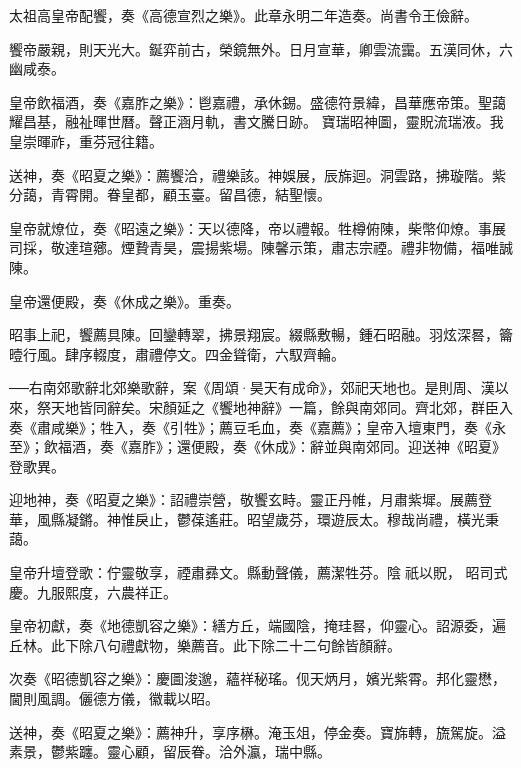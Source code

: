 \begin{pinyinscope}
 太祖高皇帝配饗，奏《高德宣烈之樂》。此章永明二年造奏。尚書令王儉辭。



 饗帝嚴親，則天光大。鋋弈前古，榮鏡無外。日月宣華，卿雲流靄。五漢同休，六幽咸泰。



 皇帝飲福酒，奏《嘉胙之樂》：鬯嘉禮，承休錫。盛德符景緯，昌華應帝策。聖藹耀昌基，融祉暉世曆。聲正涵月軌，書文騰日跡。
 寶瑞昭神圖，靈貺流瑞液。我皇崇暉祚，重芬冠往籍。



 送神，奏《昭夏之樂》：薦饗洽，禮樂該。神娛展，辰旆迴。洞雲路，拂璇階。紫分藹，青霄開。眷皇都，顧玉臺。留昌德，結聖懷。



 皇帝就燎位，奏《昭遠之樂》：天以德降，帝以禮報。牲樽俯陳，柴幣仰燎。事展司採，敬達瑄薌。煙贄青昊，震揚紫場。陳馨示策，肅志宗禋。禮非物備，福唯誠陳。



 皇帝還便殿，奏《休成之樂》。重奏。



 昭事上祀，饗薦具陳。回鑾轉翠，拂景翔宸。綴縣敷暢，鍾石昭融。羽炫深晷，籥曀行風。肆序輟度，肅禮停文。四金聳衛，六馭齊輪。



 ──右南郊歌辭北郊樂歌辭，案《周頌·昊天有成命》，郊祀天地也。是則周、漢以來，祭天地皆同辭矣。宋顏延之《饗地神辭》一篇，餘與南郊同。齊北郊，群臣入奏《肅咸樂》；牲入，奏《引牲》；薦豆毛血，奏《嘉薦》；皇帝入壇東門，奏《永至》；飲福酒，奏《嘉胙》；還便殿，奏《休成》：辭並與南郊同。迎送神《昭夏》登歌異。



 迎地神，奏《昭夏之樂》：詔禮崇營，敬饗玄畤。靈正丹帷，月肅紫墀。展薦登華，風縣凝鏘。神惟戾止，鬱葆遙莊。昭望歲芬，環遊辰太。穆哉尚禮，橫光秉藹。



 皇帝升壇登歌：佇靈敬享，禋肅彞文。縣動聲儀，薦潔牲芬。陰祇以貺，
 昭司式慶。九服熙度，六農祥正。



 皇帝初獻，奏《地德凱容之樂》：繕方丘，端國陰，掩珪晷，仰靈心。詔源委，遍丘林。此下除八句禮獻物，樂薦音。此下除二十二句餘皆顏辭。



 次奏《昭德凱容之樂》：慶圖浚邈，蘊祥秘瑤。伣天炳月，嬪光紫霄。邦化靈懋，閫則風調。儷德方儀，徽載以昭。



 送神，奏《昭夏之樂》：薦神升，享序楙。淹玉俎，停金奏。寶旆轉，旒駕旋。溢素景，鬱紫躔。靈心顧，留辰眷。洽外瀛，瑞中縣。




\end{pinyinscope}
